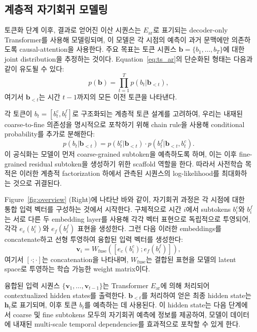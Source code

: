 \subsection{계층적 자기회귀 모델링}
\label{sec:autoregressive}

토큰화 단계 이후, 결과로 얻어진 이산 시퀀스는 $E_{\text{ar}}$로 표기되는 decoder-only Transformer를 사용해 모델링되며, 이 모델은 각 시점의 예측이 과거 문맥에만 의존하도록 causal-attention을 사용한다. 주요 목표는 토큰 시퀀스 $\mathbf{b} = \{b_1, \dots, b_T\}$에 대한 joint distribution을 추정하는 것이다. Equation~\ref{eq:ts_ar}의 단순화된 형태는 다음과 같이 유도될 수 있다:
\begin{equation}
    p(\mathbf{b}) = \prod_{t=1}^{T} p(b_t | \mathbf{b}_{<t}),
\end{equation}
여기서 $\mathbf{b}_{<t}$는 시간 $t-1$까지의 모든 이전 토큰을 나타낸다.

각 토큰이 $b_t = [b_t^{c}, b_t^{f}]$로 구조화되는 계층적 토큰 설계를 고려하여, 우리는 내재된 coarse-to-fine 의존성을 명시적으로 포착하기 위해 chain rule을 사용해 conditional probability를 추가로 분해한다:
\begin{equation}
\label{eq:chain_rule}
p(b_t | \mathbf{b}_{<t}) = p(b_t^{c} | \mathbf{b}_{<t}) \cdot p(b_t^{f} | \mathbf{b}_{<t}, b_t^{c}).
\end{equation}
이 공식화는 모델이 먼저 coarse-grained subtoken을 예측하도록 하며, 이는 이후 fine-grained residual subtoken을 생성하기 위한 scaffold 역할을 한다. 따라서 사전학습 목적은 이러한 계층적 factorization 하에서 관측된 시퀀스의 log-likelihood를 최대화하는 것으로 귀결된다.

Figure~\ref{fig:overview} (Right)에 나타난 바와 같이, 자기회귀 과정은 각 시점에 대한 통합 입력 벡터를 구성하는 것에서 시작한다. 구체적으로 시간 $i$에서 subtokens $b_i^{c}$와 $b_i^{f}$는 서로 다른 두 embedding layer를 사용해 각각 벡터 표현으로 독립적으로 투영되어, 각각 $e_c(b_i^{c})$와 $e_f(b_i^{f})$ 표현을 생성한다. 그런 다음 이러한 embeddings를 concatenate하고 선형 투영하여 융합된 입력 벡터를 생성한다:
\begin{equation}
\label{eq:embedding}
    \mathbf{v}_i = W_{\text{fuse}}([e_c(b_i^{c}); e_f(b_i^{f})]),
\end{equation}
여기서 $[\cdot;\cdot]$는 concatenation을 나타내며, $W_{\text{fuse}}$는 결합된 표현을 모델의 latent space로 투영하는 학습 가능한 weight matrix이다.

융합된 입력 시퀀스 $\{\mathbf{v}_1, \dots, \mathbf{v}_{t-1}\}$는 Transformer $E_{\text{ar}}$에 의해 처리되어 contextualized hidden states를 출력한다. $\mathbf{b}_{< t}$를 처리하여 얻은 최종 hidden state는 $\mathbf{h}_t$로 표기되며, 이후 토큰 $b_t$를 예측하는 데 사용된다. 이 hidden state는 다음 단계에서 coarse 및 fine subtokens 모두의 자기회귀 예측에 정보를 제공하여, 모델이 데이터에 내재된 multi-scale temporal dependencies를 효과적으로 포착할 수 있게 한다.

